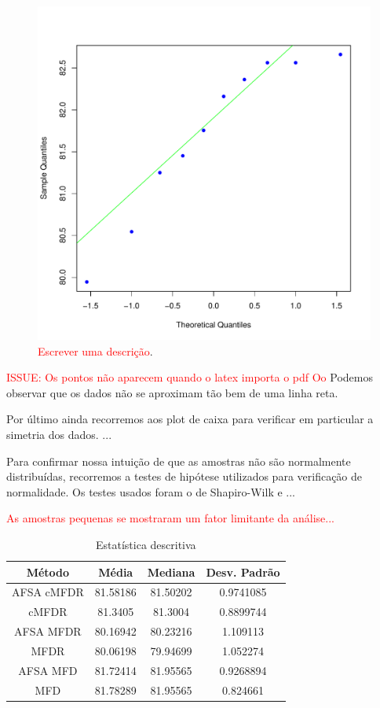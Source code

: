 \documentclass[conference]{IEEEtran}
\begin{document}
\begin{figure}[h]
	\centering
	\includegraphics[width=\linewidth]{img/bluenorm_afsa_mfd.pdf}
	\caption{\textcolor{red}{Escrever uma descrição}.}
	\label{fig:hist_afas_mfd}
\end{figure}

\textcolor{red}{ISSUE: Os pontos não aparecem quando o latex importa o pdf Oo}
Podemos observar que os dados não se aproximam tão bem de uma linha reta.

Por último ainda recorremos aos plot de caixa para verificar em particular a simetria dos dados. ...

Para confirmar nossa intuição de que as amostras não são normalmente distribuídas, recorremos a testes de hipótese utilizados para verificação de normalidade.
Os testes usados foram o de Shapiro-Wilk \cite{shapiro1965analysis} e ...	

\textcolor{red}{As amostras pequenas se mostraram um fator limitante da análise...}

\begin{table}[h]
	\centering
	\caption{Estatística descritiva}
	\label{tab:est_descr}
	\begin{tabular}{c|ccc}
		Método    & Média  & Mediana & Desv. Padrão  \\
		\hline
		AFSA cMFDR & 81.58186 	& 81.50202 	& 0.9741085 \\
		cMFDR & 81.3405 	& 81.3004 	& 0.8899744 \\
		AFSA MFDR & 80.16942 	& 80.23216 	& 1.109113 \\
		MFDR & 80.06198 	& 79.94699 	& 1.052274 \\
		AFSA MFD & 81.72414 	& 81.95565 	& 0.9268894 \\
		MFD & 81.78289 	& 81.95565 	& 0.824661 \\
		\hline
	\end{tabular}
\end{table}
\end{document}
